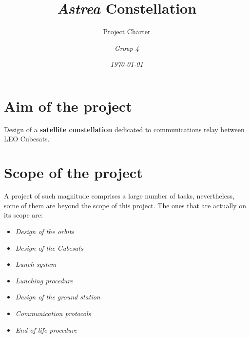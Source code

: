 \documentclass[12pt, titlepage]{scrartcl}
\title{\textbf{\textit{Astrea}} Constellation }
\subtitle{Project Charter \vspace{7cm}}
\author{\emph{Group 4}}
\date{\textit{\today}}
\begin{document}
\maketitle
\tableofcontents
\pagebreak
\pagebreak


\section{Aim of the project}
Design of a \textbf{satellite constellation} dedicated to  communications relay between LEO Cubesats. 


\section{Scope of the project}
A project of such magnitude comprises a large number of tasks, nevertheless, some of them are beyond the scope of this project. The ones that are actually on its scope are:

\begin{itemize}
  \item \textit{Design of the orbits}
  \item \textit{Design of the Cubesats}
  \item \textit{Lunch system}
  \item \textit{Lunching procedure}
  \item \textit{Design of the ground station}
  \item \textit{Communication protocols}
  \item \textit{End of life procedure}
\end{itemize}
\end{document}
